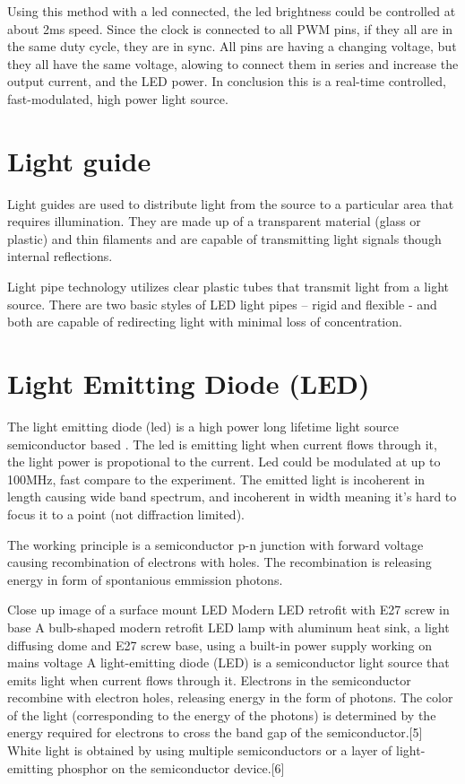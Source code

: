 \documentclass[\main/master.tex]{subfiles}
\begin{document}
\par
Using this method with a led connected, the led brightness could be controlled at about 2ms speed. Since the clock is connected to all PWM pins, if they all are in the same duty cycle, they are in sync. All pins are having a changing voltage, but they all have the same voltage, alowing to connect them in series and increase the output current, and the LED power. In conclusion this is a real-time controlled, fast-modulated, high power light source. 
\section{Light guide}

\color{blue}
\par
Light guides are used to distribute light from the source to a particular area that requires illumination. They are made up of a transparent material (glass or plastic) and thin filaments and are capable of transmitting light signals though internal reflections.  

Light pipe technology utilizes clear plastic tubes that transmit light from a light source. There are two basic styles of LED light pipes – rigid and flexible - and both are capable of redirecting light with minimal loss of concentration.

\color{black}
\section{Light Emitting Diode (LED)}
The light emitting diode (led) is a high power long lifetime light source semiconductor based . The led is emitting light when current flows through it, the light power is propotional to the current. Led could be modulated at up to 100MHz, fast compare to the experiment. The emitted light is incoherent in length causing wide band spectrum, and incoherent in width meaning it's hard to focus it to a point (not diffraction limited).
\par
The working principle is a semiconductor p-n junction with forward voltage causing recombination of electrons with holes. The recombination is releasing energy in form of spontanious emmission photons. 

\color{blue}
\par


Close up image of a surface mount LED
Modern LED retrofit with E27 screw in base
A bulb-shaped modern retrofit LED lamp with aluminum heat sink, a light diffusing dome and E27 screw base, using a built-in power supply working on mains voltage
A light-emitting diode (LED) is a semiconductor light source that emits light when current flows through it. Electrons in the semiconductor recombine with electron holes, releasing energy in the form of photons. The color of the light (corresponding to the energy of the photons) is determined by the energy required for electrons to cross the band gap of the semiconductor.[5] White light is obtained by using multiple semiconductors or a layer of light-emitting phosphor on the semiconductor device.[6]
\end{document}
